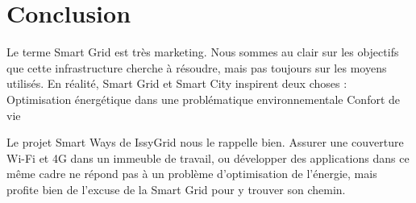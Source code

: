 \chapter*{Conclusion}

Le terme Smart Grid est très marketing. Nous sommes au clair sur les objectifs que cette infrastructure cherche à résoudre, mais pas toujours sur les moyens utilisés. 
En réalité, Smart Grid et Smart City inspirent deux choses : 
Optimisation énergétique dans une problématique environnementale 
Confort de vie

Le projet Smart Ways de IssyGrid nous le rappelle bien. Assurer une couverture Wi-Fi et 4G dans un immeuble de travail, ou développer des applications dans ce même cadre ne répond pas à un problème d’optimisation de l'énergie, mais profite bien de l’excuse de la Smart Grid pour y trouver son chemin. 
